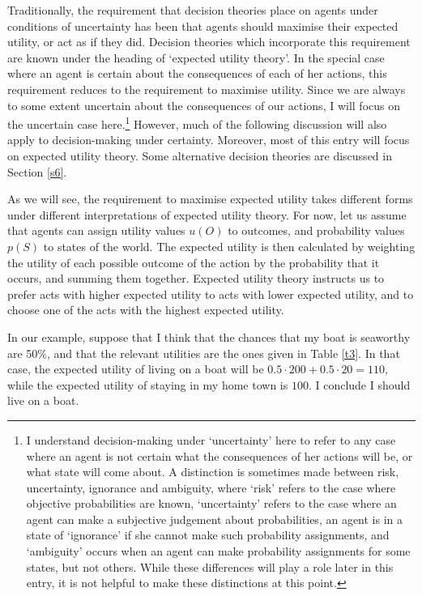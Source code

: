 Traditionally, the requirement that decision theories place on agents under conditions of uncertainty has been that agents should maximise their expected utility, or act as if they did. Decision theories which incorporate this requirement are known under the heading of `expected utility theory'. In the special case where an agent is certain about the consequences of each of her actions, this requirement reduces to the requirement to maximise utility. Since we are always to some extent uncertain about the consequences of our actions, I will focus on the uncertain case here.\footnote{I understand decision-making under `uncertainty' here to refer to any case where an agent is not certain what the consequences of her actions will be, or what state will come about. A distinction is sometimes made between risk, uncertainty, ignorance and ambiguity, where `risk' refers to the case where objective probabilities are known, `uncertainty' refers to the case where an agent can make a subjective judgement about probabilities, an agent is in a state of `ignorance' if she cannot make such probability assignments, and `ambiguity' occurs when an agent can make probability assignments for some states, but not others. While these differences will play a role later in this entry, it is not helpful to make these distinctions at this point.} However, much of the following discussion will also apply to decision-making under certainty. Moreover, most of this entry will focus on expected utility theory. Some alternative decision theories are discussed in Section \ref{s6}.

As we will see, the requirement to maximise expected utility takes different forms under different interpretations of expected utility theory. For now, let us assume that agents can assign utility values $u(O)$ to outcomes, and probability values $p(S)$ to states of the world. The expected utility is then calculated by weighting the utility of each possible outcome of the action by the probability that it occurs, and summing them together. Expected utility theory instructs us to prefer acts with higher expected utility to acts with lower expected utility, and to choose one of the acts with the highest expected utility.

In our example, suppose that I think that the chances that my boat is seaworthy are 50\%, and that the relevant utilities are the ones given in Table \ref{t3}. In that case, the expected utility of living on a boat will be $0.5 \cdot 200 + 0.5 \cdot 20 = 110$, while the expected utility of staying in my home town is $100$. I conclude I should live on a boat.

